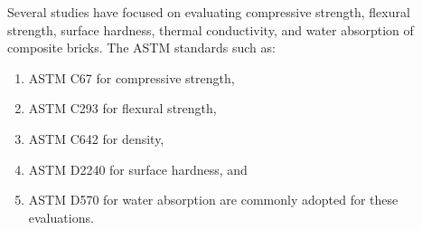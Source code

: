 \noindent Several studies have focused on evaluating compressive strength, flexural strength, surface hardness, thermal conductivity, and water absorption of composite bricks. The ASTM standards such as:

\begin{enumerate}
	\item ASTM C67 for compressive strength,
	\item ASTM C293 for flexural strength,
	\item ASTM C642 for density,
	\item ASTM D2240 for surface hardness, and
	\item ASTM D570 for water absorption are commonly adopted for these evaluations.
\end{enumerate}

